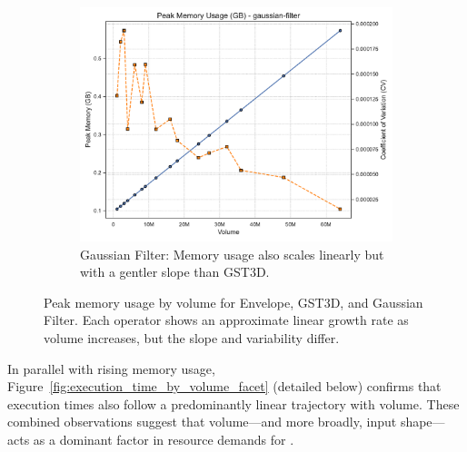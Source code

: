 \begin{figure}[htbp]
\begin{subfigure}[t]{0.49\textwidth}
    \end{subfigure}
    \hfill
    \begin{subfigure}[t]{0.49\textwidth}
        \centering
        \includegraphics[width=\textwidth]{assets/images/05/peak_memory_by_volume_gaussian-filter}
        \caption{Gaussian Filter: Memory usage also scales linearly but with a gentler slope than \ac{GST3D}.}
    \end{subfigure}
    \caption{Peak memory usage by volume for Envelope, \ac{GST3D}, and Gaussian Filter.
    Each operator shows an approximate linear growth rate as volume increases, but the slope and variability differ.
    }
    \label{fig:peak_memory_facet}
\end{figure}

In parallel with rising memory usage, Figure~\ref{fig:execution_time_by_volume_facet} (detailed below) confirms that execution times also follow a predominantly linear trajectory with volume.
These combined observations suggest that volume—and more broadly, input shape—acts as a dominant factor in resource demands for .

